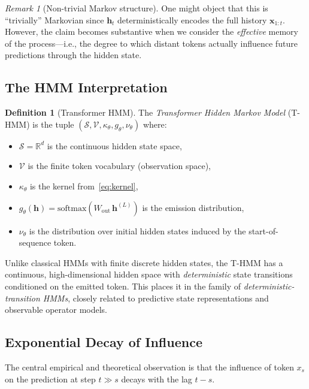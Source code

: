 \documentclass[11pt,a4paper]{article}
\theoremstyle{plain}
\theoremstyle{definition}
\newtheorem{definition}[theorem]{Definition}
\theoremstyle{remark}
\newtheorem{remark}[theorem]{Remark}
\newcommand{\R}{\mathbb{R}}
\newcommand{\cS}{\mathcal{S}}
\newcommand{\softmax}{\mathrm{softmax}}
\newcommand{\vocab}{\mathcal{V}}
\begin{document}
\begin{remark}[Non-trivial Markov structure]
One might object that this is ``trivially'' Markovian since $\bm{h}_t$
deterministically encodes the full history $\bm{x}_{1:t}$. However, the
claim becomes substantive when we consider the \emph{effective} memory of
the process---i.e., the degree to which distant tokens actually influence
future predictions through the hidden state.
\end{remark}

\subsection{The HMM Interpretation}

\begin{definition}[Transformer HMM]\label{def:thmm}
The \emph{Transformer Hidden Markov Model} (T-HMM) is the tuple
$(\cS, \vocab, \kappa_\theta, g_\theta, \nu_\theta)$ where:
\begin{itemize}[nosep]
  \item $\cS = \R^d$ is the continuous hidden state space,
  \item $\vocab$ is the finite token vocabulary (observation space),
  \item $\kappa_\theta$ is the kernel from~\eqref{eq:kernel},
  \item $g_\theta(\bm{h}) = \softmax(W_{\mathrm{out}}\, \bm{h}^{(L)})$ is the
        emission distribution,
  \item $\nu_\theta$ is the distribution over initial hidden states induced by
        the start-of-sequence token.
\end{itemize}
\end{definition}

Unlike classical HMMs with finite discrete hidden states, the T-HMM has a
continuous, high-dimensional hidden space with \emph{deterministic} state
transitions conditioned on the emitted token. This places it in the family of
\emph{deterministic-transition HMMs}, closely related to predictive state
representations and observable operator models.

\subsection{Exponential Decay of Influence}\label{sec:decay}

The central empirical and theoretical observation is that the influence of
token $x_s$ on the prediction at step $t \gg s$ decays with the lag $t - s$.
\end{document}
